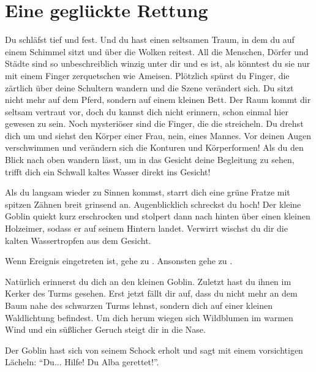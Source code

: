 \chapter*{Eine geglückte Rettung}


Du schläfst tief und fest.
Und du hast einen seltsamen Traum, in dem du auf einem Schimmel sitzt und über die Wolken reitest.
All die Menschen, Dörfer und Städte sind so unbeschreiblich winzig unter dir und es ist, als könntest du sie nur mit einem Finger zerquetschen wie Ameisen.
Plötzlich spürst du Finger, die zärtlich über deine Schultern wandern und die Szene verändert sich. Du sitzt nicht mehr auf dem Pferd, sondern auf einem kleinen Bett. Der Raum kommt dir seltsam vertraut vor, doch du kannst dich nicht erinnern, schon einmal hier gewesen zu sein.
Noch mysteriöser sind die Finger, die die streicheln.
Du drehst dich um und siehst den Körper einer Frau, nein, eines Mannes.
Vor deinen Augen verschwimmen und verändern sich die Konturen und Körperformen!
Als du den Blick nach oben wandern lässt, um in das Gesicht deine Begleitung zu sehen, trifft dich ein Schwall kaltes Wasser direkt ins Gesicht!

Als du langsam wieder zu Sinnen kommst, starrt dich eine grüne Fratze mit spitzen Zähnen breit grinsend an. %
Augenblicklich schreckst du hoch!
Der kleine Goblin quiekt kurz erschrocken und stolpert dann nach hinten über einen kleinen Holzeimer, sodass er auf seinem Hintern landet. Verwirrt wischst du dir die kalten Wassertropfen aus dem Gesicht.

Wenn Ereignis  eingetreten ist, gehe zu .
Ansonsten gehe zu .



Natürlich erinnerst du dich an den kleinen Goblin.
Zuletzt hast du ihnen im Kerker des Turms gesehen.
Erst jetzt fällt dir auf, dass du nicht mehr an dem Baum nahe des schwarzen Turms lehnst, sondern dich auf einer kleinen Waldlichtung befindest.
Um dich herum wiegen sich Wildblumen im warmen Wind und ein süßlicher Geruch steigt dir in die Nase.

Der Goblin hast sich von seinem Schock erholt und sagt mit einem vorsichtigen Lächeln: ``Du... Hilfe! Du Alba gerettet!''. 
